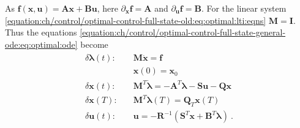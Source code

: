 \documentclass[letterpaper,10pt,english]{jupyterBook}
\begin{document}
\sphinxAtStartPar
As \(\mathbf{f}(\mathbf{x},\mathbf{u}) = \mathbf{A} \mathbf{x} + \mathbf{B}\mathbf{u}\), here \(\partial_{\mathbf{x}} \mathbf{f} = \mathbf{A}\) and \(\partial_{\mathbf{u}} \mathbf{f} = \mathbf{B}\). For the linear system \eqref{equation:ch/control/optimal-control-full-state-old:eq:optimal:lti:eqns} \(\mathbf{M} = \mathbf{I}\). Thus the equations \eqref{equation:ch/control/optimal-control-full-state-general-ode:eq:optimal:ode} become
\begin{equation}\label{equation:ch/control/optimal-control-full-state-old:eq:optimal:lti}
\begin{split}\begin{aligned}
 \delta \boldsymbol\lambda(t): & \quad \mathbf{M}   \dot{\mathbf{x}} = \mathbf{f} \\
                               & \quad \mathbf{x}(0) = \mathbf{x}_0 \\
 \delta \mathbf{x}(t)        : & \quad \mathbf{M}^T \dot{\boldsymbol{\lambda}} = -\mathbf{A}^T \boldsymbol\lambda - \mathbf{S} \mathbf{u} - \mathbf{Q} \mathbf{x} \\
 \delta \mathbf{x}(T)        : & \quad \mathbf{M}^T \boldsymbol\lambda(T) = \mathbf{Q}_T \mathbf{x}(T) \\
 \delta \mathbf{u}(t)        : & \quad \mathbf{u} = - \mathbf{R}^{-1} \left( \mathbf{S}^T \mathbf{x} + \mathbf{B}^T \boldsymbol\lambda \right) \ .
\end{aligned}\end{split}
\end{equation}
\end{document}
